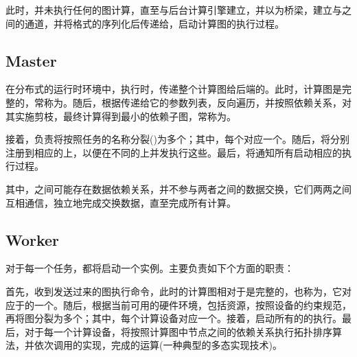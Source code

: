\begin{content}
此时，并未执行任何的图计算，直至与后台计算引擎建立，并以为桥梁，建立与之间的通道，并将格式的序列化后传递给，启动计算图的执行过程。

\subsection{Master}

在分布式的运行时环境中，执行时，传递整个计算图给后端的。此时，计算图是完整的，常称为\emph{}。随后，根据传递给它的参数列表，反向遍历，并按照依赖关系，对其实施剪枝，最终计算得到最小的依赖子图，常称为。

接着，负责将按照任务的名称分裂()为多个；其中，每个对应一个。随后，将分别注册到相应的上，以便在不同的上并发执行这些。最后，将通知所有启动相应的执行过程。

其中，之间可能存在数据依赖关系，并不参与两者之间的数据交换，它们两两之间互相通信，独立地完成交换数据，直至完成所有计算。

\subsection{Worker}

对于每一个任务，\tf{}都将启动一个实例。主要负责如下个方面的职责：

\begin{enum}
\end{enum}

首先，收到发送过来的图执行命令，此时的计算图相对于是完整的，也称为，它对应于的一个。随后，根据当前可用的硬件环境，包括资源，按照设备的约束规范，再将图分裂为多个；其中，每个计算设备对应一个。接着，启动所有的的执行。最后，对于每一个计算设备，将按照计算图中节点之间的依赖关系执行拓扑排序算法，并依次调用的实现，完成的运算(一种典型的多态实现技术)。


\end{content}
